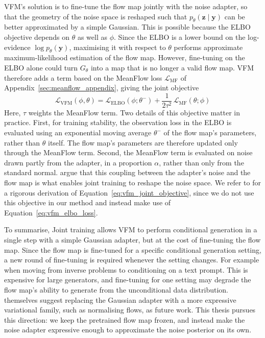 \documentclass[12pt,a4paper]{report}
\begin{document}
VFM's solution is to fine-tune the flow map jointly with the noise adapter, so that the geometry of the noise space is reshaped such that $p_{\theta}(\mathbf{z}\mid\mathbf{y})$ can be better approximated by a simple Gaussian. 
This is possible because the ELBO objective depends on $\theta$ as well as $\phi$. Since the ELBO is a lower bound on the log-evidence $\log p_{\theta}(\mathbf{y})$, maximising it with respect to $\theta$ performs approximate maximum-likelihood estimation of the flow map. However, fine-tuning on the ELBO alone could turn $G_{\theta}$ into a map that is no longer a valid flow map. VFM therefore adds a term based on the MeanFlow loss $\mathcal{L}_{\mathrm{MF}}$ of Appendix~\ref{sec:meanflow_appendix}, giving the joint objective
\begin{equation}
\mathcal{L}_{\mathrm{VFM}}(\phi,\theta)
=
\mathcal{L}_{\mathrm{ELBO}}(\phi;\theta^{-})
+
\frac{1}{2\tau^2}\,\mathcal{L}_{\mathrm{MF}}(\theta;\phi)
\label{eq:vfm_joint_objective}
\end{equation}
Here, $\tau$ weights the MeanFlow term. Two details of this objective matter in practice. First, for training stability, the observation loss in the ELBO is evaluated using an exponential moving average $\theta^{-}$ of the flow map's parameters, rather than $\theta$ itself. The flow map's parameters are therefore updated only through the MeanFlow term. Second, the MeanFlow term is evaluated on noise drawn partly from the adapter, in a proportion $\alpha$, rather than only from the standard normal. \textcite{VFM} argue that this coupling between the adapter's noise and the flow map is what enables joint training to reshape the noise space. We refer to \textcite{VFM} for a rigorous derivation of Equation~\ref{eq:vfm_joint_objective}, since we do not use this objective in our method and instead make use of Equation~\ref{eq:vfm_elbo_loss}.

To summarise, Joint training allows VFM to perform conditional generation in a single step with a simple Gaussian adapter, but at the cost of fine-tuning the flow map. 
Since the flow map is fine-tuned for a specific conditional generation setting, a new round of fine-tuning is required whenever the setting changes. For example when moving from inverse problems to conditioning on a text prompt.
This is expensive for large generators, and fine-tuning for one setting may degrade the flow map's ability to generate from the unconditional data distribution. \textcite{VFM} themselves suggest replacing the Gaussian adapter with a more expressive variational family, such as normalising flows, as future work. This thesis pursues this direction: we keep the pretrained flow map frozen, and instead make the noise adapter expressive enough to approximate the noise posterior on its own.
\end{document}
